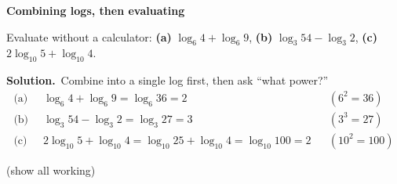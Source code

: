 \documentclass[11pt]{article}
\begin{document}
\begin{workedbox}

{\bfseries\color{chalkdk}Combining logs, then evaluating}\par\vspace{3pt}

Evaluate without a calculator: \textbf{(a)} $\log_6 4+\log_6 9$, \textbf{(b)} $\log_3 54-\log_3 2$, \textbf{(c)} $2\log_{10}5+\log_{10}4$.\par\vspace{2pt}

{\bfseries Solution.}\ Combine into a single log first, then ask ``what power?'' \begin{align*} \text{(a)}\;\;&\log_6 4+\log_6 9=\log_6 36=2 &&(6^2=36)\\ \text{(b)}\;\;&\log_3 54-\log_3 2=\log_3 27=3 &&(3^3=27)\\ \text{(c)}\;\;&2\log_{10}5+\log_{10}4=\log_{10}25+\log_{10}4=\log_{10}100=2 &&(10^2=100) \end{align*}

\end{workedbox}
\newpage
{}\;\textcolor{inksoft}{\small(show all working)}\par\nopagebreak\vspace{2pt}
\end{document}
